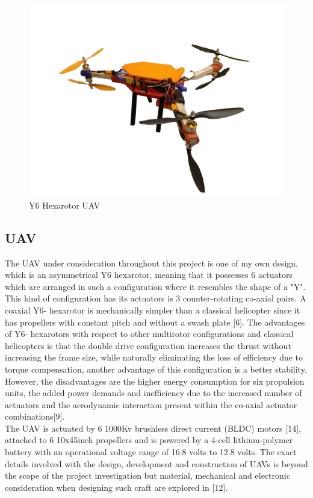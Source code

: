 \documentclass[12pt,a4paper,twoside]{report}
\begin{document}
		\newpage
		
		\begin{figure}[h!]
			\centering
			\includegraphics[width=0.6\linewidth]{Y6UAV1-removebg-preview.png}
			\caption{Y6 Hexarotor UAV}
			\label{fig:Y6Hexarotor}
		\end{figure}
		
		\subsection{UAV}
			The UAV under consideration throughout this project is one of my own design, which is an asymmetrical Y6 hexarotor, meaning that it possesses 6 actuators which are arranged in such a configuration where it resembles the shape of a "Y". This kind of configuration has its actuators is 3 counter-rotating co-axial pairs. A coaxial Y6- hexarotor is mechanically simpler than a classical helicopter since it has propellers with constant pitch and without a swash plate [6]. The advantages of Y6- hexarotors with respect to other multirotor configurations and classical helicopters is that the double drive configuration increases the thrust without increasing the frame size, while naturally eliminating the loss of efficiency due to torque compensation, another advantage of this configuration is a better stability. However, the disadvantages are the higher energy consumption for six propulsion units, the added power demands and inefficiency due to the increased number of actuators and the aerodynamic interaction present within the co-axial actuator combinations[9].
			\\
			The UAV is actuated by 6 1000Kv brushless direct current (BLDC) motors [14], attached to 6 10x45inch propellers and is powered by a 4-cell lithium-polymer battery with an operational voltage range of 16.8 volts to 12.8 volts. The exact details involved with the design, development and construction of UAVs is beyond the scope of the project investigation but material, mechanical and electronic consideration when designing such craft are explored in [12].
			
\end{document}
